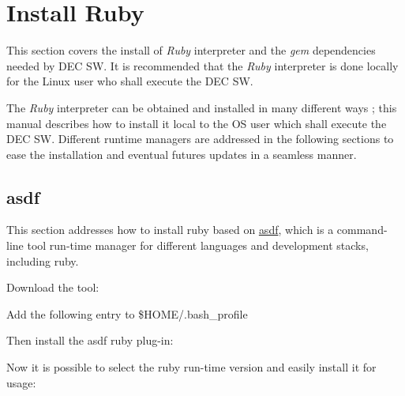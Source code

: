\documentclass[dec_sum_main.tex]{subfiles}
\begin{document}
 

\section{Install Ruby}
 This section covers the install of \textit{Ruby} interpreter and the \textit{gem} dependencies needed by DEC SW. It is recommended that the \textit{Ruby} interpreter is done locally for the Linux user who shall execute the DEC SW.\newline

\par
\noindent 
The \textit{Ruby} interpreter can be obtained and installed in many different ways ; this manual describes how to install it local to the OS user which shall execute the DEC SW. Different runtime managers are addressed in the following sections to ease the installation and eventual futures updates in a seamless manner.

\subsection{asdf}
\par
\noindent
This section addresses how to install ruby based on \href{https://asdf-vm.com/guide/getting-started.html#_1-install-dependencies}{asdf}, which is a command-line tool run-time manager for different languages and development stacks, including ruby.\newline

\par
\noindent
Download the tool:

  \newline

Add the following entry to \$HOME/.bash\_profile 

  \newline


\par
\noindent
Then install the asdf ruby plug-in:

 \newline

\par
\noindent
Now it is possible to select the ruby run-time version and easily install it for usage:\newline

\end{document}
